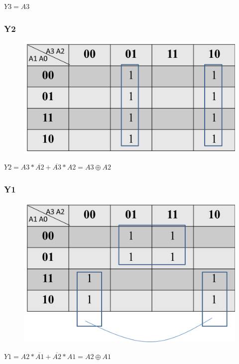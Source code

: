 \documentclass{article}
\begin{document}
$Y3 = A3$

\newpage

\subsubsection{Y2}

\begin{figure}[!hbp]
  \centering
  \includegraphics[scale=0.45]{S5.png}
\end{figure}

$Y2 = A3 * \overline{A2} + \overline{A3} * A2 = A3 \oplus A2$

\subsubsection{Y1}

\begin{figure}[!hbp]
  \centering
  \includegraphics[scale=0.45]{S6.png}
\end{figure}

$Y1 = A2 * \overline{A1} + \overline{A2} * A1 = A2 \oplus A1$
\end{document}
